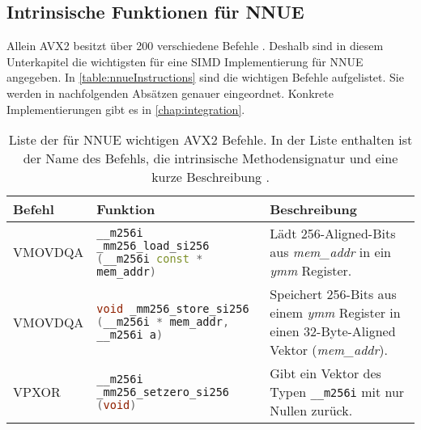 \subsection{Intrinsische Funktionen für NNUE}
\label{chap:intrinsicsForNNUE}

Allein \ac{AVX2} besitzt über 200 verschiedene Befehle \cite{intelIntrinsics}. Deshalb sind in diesem Unterkapitel die wichtigsten für eine \ac{SIMD} Implementierung für NNUE angegeben. In \autoref{table:nnueInstructions} sind die wichtigen Befehle aufgelistet. Sie werden in nachfolgenden Absätzen genauer eingeordnet. Konkrete Implementierungen gibt es in \autoref{chap:integration}.

\begin{table}[ht]
  \caption{Liste der für \ac{NNUE} wichtigen \ac{AVX2} Befehle. In der Liste enthalten ist der Name des Befehls, die intrinsische Methodensignatur und eine kurze Beschreibung \cite{intelIntrinsics}.}
  \label{table:nnueInstructions}
  \renewcommand{\arraystretch}{1.2}
  \centering
  \sffamily
  \begin{footnotesize}
    \begin{tabularx}{\textwidth}{l X X}
      \toprule
      \textbf{Befehl} & \textbf{Funktion}                                                                                                                                                                                    & \textbf{Beschreibung} \\
      \midrule
      VMOVDQA         & \lstinline[language=C++]{__m256i _mm256_load_si256 (__m256i const * mem_addr)} & Lädt 256-Aligned-Bits aus \emph{mem\_addr} in ein \emph{ymm} Register.                                                                                                                                                                 \\
      VMOVDQA         & \lstinline[language=C++]{void _mm256_store_si256 (__m256i * mem_addr, __m256i a)} & Speichert 256-Bits aus einem \emph{ymm} Register in einen 32-Byte-Aligned Vektor (\emph{mem\_addr}).                                                                                                                                      \\
      VPXOR           & \lstinline[language=C++]{__m256i _mm256_setzero_si256 (void)} & Gibt ein Vektor des Typen \lstinline[language=C++]{__m256i} mit nur Nullen zurück.                                                                                                                                                                        \\

\end{tabularx}
\end{footnotesize}
\end{table}
